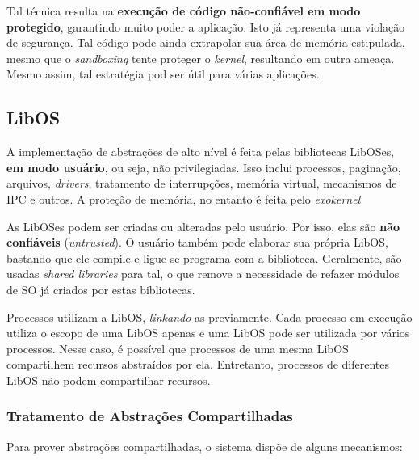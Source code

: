 Tal técnica resulta na \textbf{execução de código não-confiável em modo protegido}, garantindo muito poder a aplicação. Isto já representa uma violação de segurança. Tal código pode ainda extrapolar sua área de memória estipulada, mesmo que o \textit{sandboxing} tente proteger o \textit{kernel}, resultando em outra ameaça. Mesmo assim, tal estratégia pod ser útil para várias aplicações.


\subsection{LibOS}
A implementação de abstrações de alto nível é feita pelas bibliotecas LibOSes, \textbf{em modo usuário}, ou seja, não privilegiadas. Isso inclui processos, paginação, arquivos, \textit{drivers}, tratamento de interrupções, memória virtual, mecanismos de IPC e outros. A proteção de memória, no entanto é feita pelo \textit{exokernel}

As LibOSes podem ser criadas ou alteradas pelo usuário. Por isso, elas são \textbf{não confiáveis} (\textit{untrusted}). O usuário também pode elaborar sua própria LibOS, bastando que ele compile e ligue se programa com a biblioteca. Geralmente, são usadas \textit{shared libraries} para tal, o que remove a necessidade de refazer módulos de SO já criados por estas bibliotecas.

Processos utilizam a LibOS, \textit{linkando}-as previamente. Cada processo em execução utiliza o escopo de uma LibOS apenas e uma LibOS pode ser utilizada por vários processos. Nesse caso, é possível que processos de uma mesma LibOS compartilhem recursos abstraídos por ela. Entretanto, processos de diferentes LibOS não podem compartilhar recursos.

\subsubsection{Tratamento de Abstrações Compartilhadas}
Para prover abstrações compartilhadas, o sistema dispõe de alguns mecanismos:

